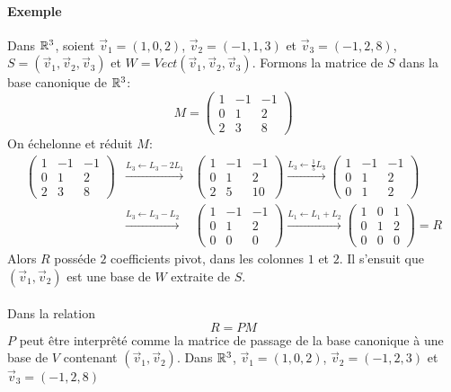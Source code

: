 \paragraph{Exemple} Dans $\mathbb{R}^3$, soient $\vec{v}_1 = (1, 0, 2)$, $\vec{v}_2 = (-1, 1, 3)$ et $\vec{v}_3 = (-1, 2, 8)$, $S = (\vec{v}_1, \vec{v}_2, \vec{v}_3)$ et $W = Vect(\vec{v}_1, \vec{v}_2, \vec{v}_3)$. Formons la matrice de $S$ dans la base canonique de $\mathbb{R}^3$:
$$M = \begin{pmatrix}
  1 & -1 & -1 \\
  0 & 1 & 2 \\
  2 & 3 & 8
\end{pmatrix}$$
On échelonne et réduit $M$:
\begin{eqnarray*}
  \begin{pmatrix}
    1 & -1 & -1 \\
    0 & 1 & 2 \\
    2 & 3 & 8
  \end{pmatrix}
  &\xrightarrow{L_3 \leftarrow L_3 - 2 L_1}&
  \begin{pmatrix}
    1 & -1 & -1 \\
    0 & 1 & 2 \\
    2 & 5 & 10
  \end{pmatrix}
  \xrightarrow{L_3 \leftarrow \frac{1}{5} L_3}
  \begin{pmatrix}
    1 & -1 & -1 \\
    0 & 1 & 2 \\
    0 & 1 & 2
  \end{pmatrix}
  \\
  &\xrightarrow{L_3 \leftarrow L_3 - L_2}&
  \begin{pmatrix}
    1 & -1 & -1 \\
    0 & 1 & 2 \\
    0 & 0 & 0
  \end{pmatrix}
  \xrightarrow{L_1 \leftarrow L_1 + L_2}
  \begin{pmatrix}
    1 & 0 & 1 \\
    0 & 1 & 2 \\
    0 & 0 & 0
  \end{pmatrix} = R
\end{eqnarray*}
Alors $R$ posséde $2$ coefficients pivot, dans les colonnes $1$ et $2$. Il s'ensuit que $(\vec{v}_1, \vec{v}_2)$ est une base de $W$ extraite de $S$. 
\\\\
Dans la relation
$$R = P M$$
$P$ peut être interprêté comme la matrice de passage de la base canonique à une base de $V$ contenant $(\vec{v}_1, \vec{v}_2)$. Dans $\mathbb{R}^3$, $\vec{v}_1 = (1, 0, 2)$, $\vec{v}_2 = (-1, 2, 3)$ et $\vec{v}_3 = (-1, 2, 8)$
